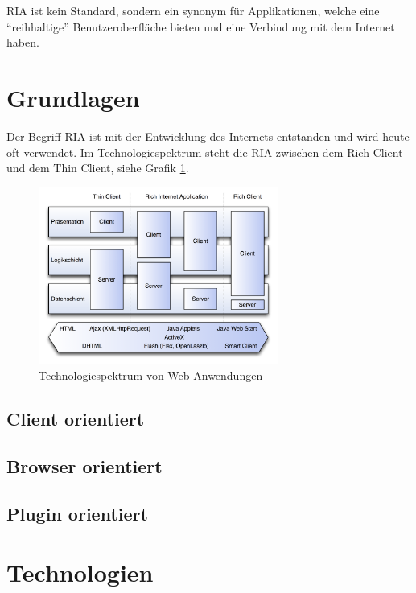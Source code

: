   \ac{RIA} ist kein Standard, sondern ein synonym für Applikationen, welche
  eine ``reihhaltige'' Benutzeroberfläche bieten und eine Verbindung mit dem
  Internet haben.
  
  \section{Grundlagen}
  
  Der Begriff \ac{RIA} ist mit der Entwicklung des Internets entstanden und
  wird heute oft verwendet. Im Technologiespektrum steht die \ac{RIA} zwischen
  dem Rich Client und dem Thin Client, siehe Grafik \ref{img:webanwendungen}.
  
  \begin{figure}[h]
    \begin{center}
      \includegraphics[width=0.7\textwidth]{./image/webanwendungen.png}
      \caption{Technologiespektrum von Web Anwendungen
      \cite{WebApplicationSolutions}}
      \label{img:webanwendungen}
    \end{center}
  \end{figure}
  
  
  \subsection{Client orientiert}

  \subsection{Browser orientiert}
  
  \subsection{Plugin orientiert}
  
  \section{Technologien}
  
